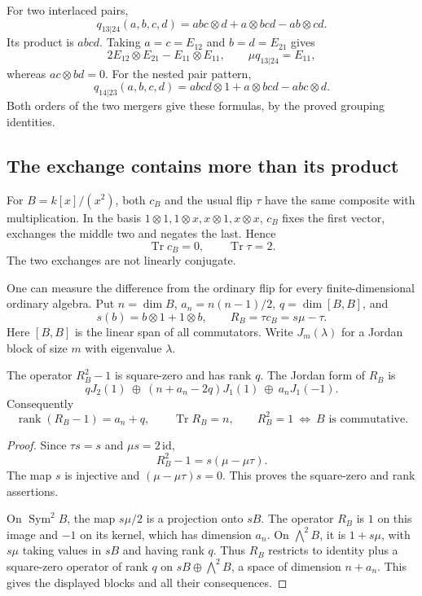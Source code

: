 For two interlaced pairs,
\begin{equation}\label{v4-eq:regular-contextual-four}
 q_{13|24}(a,b,c,d)
       =abc\otimes d+a\otimes bcd-ab\otimes cd.
\end{equation}
Its product is \(abcd\). Taking
\(a=c=E_{12}\) and \(b=d=E_{21}\) gives
\[
 2E_{12}\otimes E_{21}-E_{11}\otimes E_{11},
 \qquad \mu q_{13|24}=E_{11},
\]
whereas \(ac\otimes bd=0\).
For the nested pair pattern,
\[
 q_{14|23}(a,b,c,d)
       =abcd\otimes1+a\otimes bcd-abc\otimes d.
\]
Both orders of the two mergers give these formulas,
by the proved grouping identities.

\subsection{The exchange contains more than its product}

For \(B=k[x]/(x^2)\), both \(c_B\) and the usual flip
\(\tau\) have the same composite with multiplication.
In the basis \(1\otimes1,1\otimes x,x\otimes1,x\otimes x\),
\(c_B\) fixes the first vector, exchanges the middle
two and negates the last. Hence
\[
 \operatorname{Tr}c_B=0,\qquad \operatorname{Tr}\tau=2.
\]
The two exchanges are not linearly conjugate.

One can measure the difference from the ordinary flip
for every finite-dimensional ordinary algebra. Put
\(n=\dim B\), \(a_n=n(n-1)/2\), \(q=\dim[B,B]\), and
\[
 s(b)=b\otimes1+1\otimes b,\qquad R_B=\tau c_B=s\mu-\tau.
\]
Here \([B,B]\) is the linear span of all commutators.
Write \(J_m(\lambda)\) for a Jordan block of size \(m\)
with eigenvalue \(\lambda\).

\begin{proposition}\label{v4-prop:regular-exchange-jordan}
The operator \(R_B^2-1\) is square-zero and has rank \(q\).
The Jordan form of \(R_B\) is
\[
 qJ_2(1)\ \oplus\
 (n+a_n-2q)J_1(1)\ \oplus\ a_nJ_1(-1).
\]
Consequently
\[
 \operatorname{rank}(R_B-1)=a_n+q,\qquad
 \operatorname{Tr}R_B=n,\qquad
 R_B^2=1\ \Longleftrightarrow\ B\text{ is commutative}.
\]
\end{proposition}

\begin{proof}
Since \(\tau s=s\) and \(\mu s=2\,\mathrm{id}\),
\[
 R_B^2-1=s(\mu-\mu\tau).
\]
The map \(s\) is injective and
\((\mu-\mu\tau)s=0\). This proves the square-zero
and rank assertions.

On \(\operatorname{Sym}^2B\), the map \(s\mu/2\)
is a projection onto \(sB\). The operator \(R_B\)
is \(1\) on this image and \(-1\) on its kernel,
which has dimension \(a_n\).
On \(\bigwedge^2B\), it is \(1+s\mu\), with
\(s\mu\) taking values in \(sB\) and having rank \(q\).
Thus \(R_B\) restricts to identity plus a square-zero
operator of rank \(q\) on
\(sB\oplus\bigwedge^2B\), a space of dimension \(n+a_n\).
This gives the displayed blocks and all their consequences.
\end{proof}

